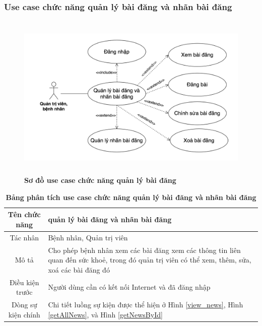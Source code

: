 \subsubsection{Use case chức năng quản lý bài đăng và nhãn bài đăng}
  \begin{figure}[H]
    \centering
    \includegraphics[width=15cm,height=8cm]{Images/use_case/use_case_news.png}
    \caption[Sơ đồ use case chức năng quản lý bài đăng]{\bfseries \fontsize{12pt}{0pt}
    \selectfont Sơ đồ use case chức năng quản lý bài đăng}
    \label{use_case_news} %
  \end{figure}

  \begin{table}[H]
    \caption{\bfseries \fontsize{12pt}{0pt}\selectfont Bảng phân tích use case chức năng quản lý bài đăng và nhãn bài đăng}
    \centering
    \begin{tabularx}{0.9\textwidth}{|c|X|}
      \hline
      \textbf{Tên chức năng} & \textbf{quản lý bài đăng và nhãn bài đăng} \\
      \hline
      Tác nhân & Bệnh nhân, Quản trị viên \\
      \hline
      Mô tả & Cho phép bệnh nhân xem các bài đăng xem các thông tin liên quan đến sức khoẻ, trong đó quản trị viên có thể
      xem, thêm, sửa, xoá các bài đăng đó  \\
      \hline
      Điều kiện trước & Người dùng cần có kết nối Internet và đã đăng nhập \\
      \hline
      Dòng sự kiện chính & 
        Chi tiết luồng sự kiện được thể hiện ở Hình \ref{view_news}, Hình \ref{getAllNews},
        và Hình \ref{getNewsById} \\
      \hline
    \end{tabularx}
  \end{table}

